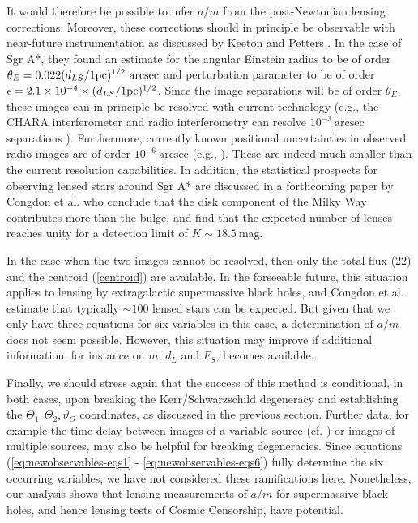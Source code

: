 \documentclass[prd,12pt,a4paper,showpacs]{revtex4}
\def\t{\Theta}
\def\to{\t_1}
\def\tt{\t_2}
\begin{document}
It would therefore be possible to infer $a/m$ from the post-Newtonian lensing corrections. Moreover, these 
corrections should in principle be observable with near-future instrumentation as discussed by 
Keeton and Petters \cite{keeton2}. In the case of Sgr A*, they
found an estimate for the angular Einstein radius to be of order
$\theta_E = 0.022 (d_{LS}/ 1 {\rm pc})^{1/2}\ \mathrm{arcsec}$ and  
perturbation parameter to be of order 
$\epsilon=2.1 \times 10^{-4} \times (d_{LS}/ 1 {\rm pc})^{1/2}$.  
Since the image separations will be of order $\theta_E$, these images
can in principle be resolved with current technology (e.g., the CHARA interferometer
and radio interferometry can resolve $10^{-3} \ \mathrm{arcsec}$ separations \cite{brumm}). 
Furthermore, currently known positional uncertainties in observed radio images  
are of order $10^{-6} \ \mathrm{arcsec}$
(e.g., \cite{trotter}).   
These are indeed much smaller than the current resolution capabilities. 
In addition,
the statistical prospects for observing lensed stars around 
Sgr A* are discussed in a forthcoming paper by 
Congdon et al. \cite{congdon} who conclude that the disk component of the 
Milky Way contributes more than the bulge, 
and find that the expected number of lenses reaches unity for a 
detection limit of $K\sim \mathrm{18.5 \ mag}$. 
  
In the case when the two images cannot be resolved, then only the total flux (22) 
and the centroid (\ref{centroid}) are available. In the 
forseeable future, this situation applies to lensing by 
extragalactic supermassive black holes, and Congdon et al. \cite{congdon} estimate that 
typically $\sim 100$ lensed stars can be expected. 
But given that we only have three equations for six variables in this case, 
a determination of $a/m$ does not seem possible. However, 
this situation may improve if additional information, for instance on $m$, $d_L$ and $F_S$, 
becomes available.

Finally, we should stress again that the success of this method is conditional, in both cases, 
upon breaking the Kerr/Schwarzschild degeneracy and establishing the $\to,\tt,\vartheta_O$ 
coordinates, as discussed in the previous section. Further data, for example the time delay 
between images of a variable source (cf. \cite{keeton2}) or images of multiple sources, may also be helpful for 
breaking degeneracies. Since equations (\ref{eq:newobservables-eqs1} - \ref{eq:newobservables-eqs6}) 
fully determine the six occurring variables, we have not considered these ramifications here. 
Nonetheless, our analysis shows that lensing measurements of $a/m$ for supermassive black holes, 
and hence lensing tests of Cosmic Censorship, have potential.
\end{document}
